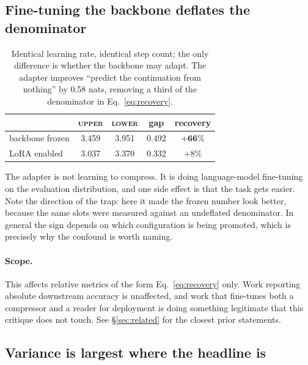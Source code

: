 \documentclass[11pt]{article}
\begin{document}
\subsection{Fine-tuning the backbone deflates the denominator}

\begin{table}[ht]
\centering
\begin{tabular}{lcccc}
\toprule
 & \textsc{upper} & \textsc{lower} & gap & recovery \\
\midrule
backbone frozen & 3.459 & 3.951 & 0.492 & $\mathbf{+66\%}$ \\
LoRA enabled    & 3.037 & $\mathbf{3.370}$ & $\mathbf{0.332}$ & $+8\%$ \\
\bottomrule
\end{tabular}
\caption{Identical learning rate, identical step count; the only difference is
whether the backbone may adapt. The adapter improves ``predict the continuation
from nothing'' by 0.58 nats, removing a third of the denominator in
Eq.~\ref{eq:recovery}.}
\label{tab:lora}
\end{table}

The adapter is not learning to compress. It is doing language-model fine-tuning
on the evaluation distribution, and one side effect is that the task gets
easier. Note the direction of the trap: here it made the frozen number look
better, because the same slots were measured against an undeflated denominator.
In general the sign depends on which configuration is being promoted, which is
precisely why the confound is worth naming.

\paragraph{Scope.} This affects relative metrics of the form
Eq.~\ref{eq:recovery} only. Work reporting absolute downstream accuracy is
unaffected, and work that fine-tunes both a compressor and a reader for
deployment is doing something legitimate that this critique does not touch. See
\S\ref{sec:related} for the closest prior statements.

\subsection{Variance is largest where the headline is}
\end{document}
